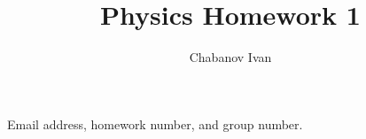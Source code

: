 \begin{titlepage}
    \title{Physics Homework 1}
    \author{Chabanov Ivan}
    \maketitle

    Email address, homework number, and group number.
\end{titlepage}